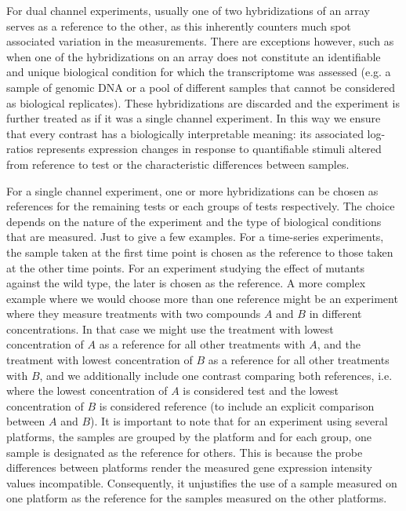 For dual channel experiments, usually one of two hybridizations of an array
serves as a reference to the other, as this inherently counters much spot
associated variation in the measurements.
%
There are exceptions however, such as when one of the hybridizations on an
array does not constitute an identifiable and unique biological condition for
which the transcriptome was assessed (e.g. a sample of genomic DNA or a pool of
different samples that cannot be considered as biological replicates).
%
These hybridizations are discarded and the experiment is further treated as if
it was a single channel experiment.
%
In this way we ensure that every contrast has a biologically interpretable
meaning: its associated log-ratios represents expression changes in response
to quantifiable stimuli altered from reference to test or the characteristic
differences between samples.

For a single channel experiment, one or more hybridizations can be chosen as
references for the remaining tests or each groups of tests respectively.
%
The choice depends on the nature of the experiment and the type of biological
conditions that are measured.
%
Just to give a few examples.  For a time-series experiments, the sample taken
at the first time point is chosen as the reference to those taken at the other
time points.  For an experiment studying the effect of mutants against the wild
type, the later is chosen as the reference.
%
A more complex example where we would choose more than one reference might be
an experiment where they measure treatments with two compounds $A$ and $B$ in
different concentrations. In that case we might use the treatment with lowest
concentration of $A$ as a reference for all other treatments with $A$, and the
treatment with lowest concentration of $B$ as a reference for all other
treatments with $B$, and we additionally include one contrast comparing both
references, i.e. where the lowest concentration of $A$ is considered test and
the lowest concentration of $B$ is considered reference (to include an explicit
comparison between $A$ and $B$).
%
It is important to note that for an experiment using several platforms, the
samples are grouped by the platform and for each group, one sample is
designated as the reference for others.  This is because the probe differences
between platforms render the measured gene expression intensity values
incompatible.  Consequently, it unjustifies the use of a sample measured on
one platform as the reference for the samples measured on the other platforms.

